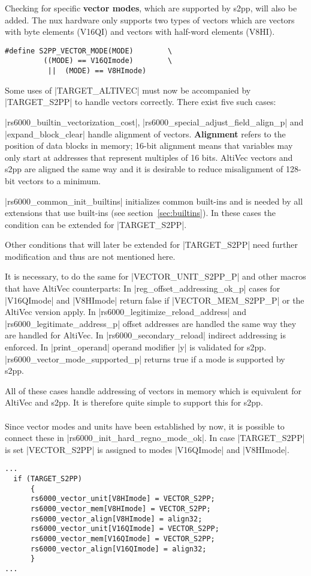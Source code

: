 Checking for specific \textbf{vector modes}, which are supported by \ac{s2pp}, will also be added.
The nux hardware only supports two types of vectors which are vectors with byte elements (V16QI) and vectors with half-word elements (V8HI).
\begin{lstlisting}
#define S2PP_VECTOR_MODE(MODE)        \
         ((MODE) == V16QImode)        \
          ||  (MODE) == V8HImode)
\end{lstlisting}

Some uses of |TARGET_ALTIVEC| must now be accompanied by |TARGET_S2PP| to handle vectors correctly.
There exist five such cases:

|rs6000_builtin_vectorization_cost|, |rs6000_special_adjust_field_align_p| and |expand_block_clear| handle alignment of vectors.
\textbf{Alignment} refers to the position of data blocks in memory; 16-bit alignment means that variables may only start at addresses that represent multiples of 16 bits.
AltiVec vectors and s2pp are aligned the same way and it is desirable to reduce misalignment of 128-bit vectors to a minimum.

|rs6000_common_init_builtins| initializes common built-ins and is needed by all extensions that use built-ins (see section~\ref{sec:builtins}).
In these cases the condition can be extended for |TARGET_S2PP|.

Other conditions that will later be extended for |TARGET_S2PP| need further modification and thus are not mentioned here.

It is necessary, to do the same for |VECTOR_UNIT_S2PP_P| and other macros that have AltiVec counterparts:
In |reg_offset_addressing_ok_p| cases for |V16QImode| and |V8HImode| return false if |VECTOR_MEM_S2PP_P| or the AltiVec version apply.
In |rs6000_legitimize_reload_address| and |rs6000_legitimate_address_p| offset addresses are handled the same way they are handled for AltiVec.
In |rs6000_secondary_reload| indirect addressing is enforced.
In |print_operand| operand modifier |y| is validated for \ac{s2pp}.
|rs6000_vector_mode_supported_p| returns true if a mode is supported by \ac{s2pp}.

All of these cases handle addressing of vectors in memory which is equivalent for AltiVec and \ac{s2pp}.
It is therefore quite simple to support this for \ac{s2pp}.
\\
\\
Since vector modes and units have been established by now, it is possible to connect these in |rs6000_init_hard_regno_mode_ok|.
In case |TARGET_S2PP| is set |VECTOR_S2PP| is assigned to modes |V16QImode| and |V8HImode|.
\begin{lstlisting}
...
  if (TARGET_S2PP)
      {
      rs6000_vector_unit[V8HImode] = VECTOR_S2PP;
      rs6000_vector_mem[V8HImode] = VECTOR_S2PP;
      rs6000_vector_align[V8HImode] = align32;
      rs6000_vector_unit[V16QImode] = VECTOR_S2PP;
      rs6000_vector_mem[V16QImode] = VECTOR_S2PP;
      rs6000_vector_align[V16QImode] = align32;
      }
...
\end{lstlisting}

